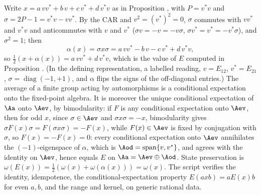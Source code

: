 Write $x = a\,vv^{*} + b\,v + c\,v^{*} + d\,v^{*}v$ as in Proposition , with $P = v^{*}v$ and $\sigma = 2P - 1 = v^{*}v - vv^{*}$. By the CAR and $v^{2} = (v^{*})^{2} = 0$, $\sigma$ commutes with $vv^{*}$ and $v^{*}v$ and anticommutes with $v$ and $v^{*}$ ($\sigma v = -v = -v\sigma$, $\sigma v^{*} = v^{*} = -v^{*}\sigma$), and $\sigma^{2} = 1$; then
\[
\alpha(x) = \sigma x \sigma = a\,vv^{*} - b\,v - c\,v^{*} + d\,v^{*}v ,
\]
so $\tfrac12(x + \alpha(x)) = a\,vv^{*} + d\,v^{*}v$, which is the value of $E$ computed in Proposition . (In the defining representation, a labelled reading, $v = E_{12}$, $v^{*} = E_{21}$, $\sigma = \operatorname{diag}(-1, +1)$, and $\alpha$ flips the signs of the off-diagonal entries.) The average of a finite group acting by automorphisms is a conditional expectation onto the fixed-point algebra. It is moreover the unique conditional expectation of $\Aa$ onto $\Aev$, by bimodularity: if $F$ is any conditional expectation onto $\Aev$, then for odd $x$, since $\sigma \in \Aev$ and $\sigma x \sigma = -x$, bimodularity gives $\sigma F(x) \sigma = F(\sigma x \sigma) = -F(x)$, while $F(x) \in \Aev$ is fixed by conjugation with $\sigma$, so $F(x) = -F(x) = 0$: every conditional expectation onto $\Aev$ annihilates the $(-1)$-eigenspace of $\alpha$, which is $\Aod = \operatorname{span}\{v, v^{*}\}$, and agrees with the identity on $\Aev$, hence equals $E$ on $\Aa = \Aev \oplus \Aod$. State preservation is $\omega(E(x)) = \tfrac12(\omega(x) + \omega(\alpha(x))) = \omega(x)$. The script verifies the identity, idempotence, the conditional-expectation property $E(axb) = aE(x)b$ for even $a, b$, and the range and kernel, on generic rational data.
